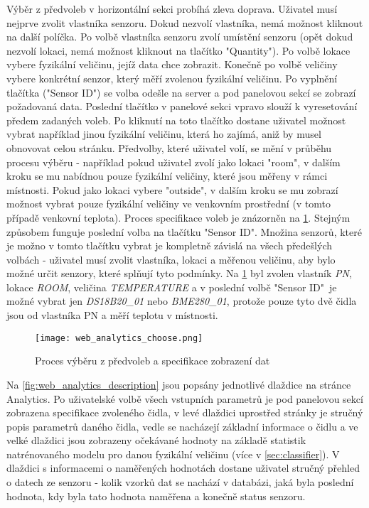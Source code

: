 Výběr z předvoleb v horizontální sekci probíhá zleva doprava. Uživatel musí nejprve zvolit vlastníka senzoru. Dokud nezvolí vlastníka, nemá možnost kliknout na další políčka. Po volbě vlastníka senzoru zvolí umístění senzoru (opět dokud nezvolí lokaci, nemá možnost kliknout na tlačítko "Quantity"). Po volbě lokace vybere fyzikální veličinu, jejíž data chce zobrazit. Konečně po volbě veličiny vybere konkrétní senzor, který měří zvolenou fyzikální veličinu. Po vyplnění tlačítka ("Sensor ID") se volba odešle na server a pod panelovou sekcí se zobrazí požadovaná data. Poslední tlačítko v panelové sekci vpravo slouží k vyresetování předem zadaných voleb. Po kliknutí na toto tlačítko dostane uživatel možnost vybrat například jinou fyzikální veličinu, která ho zajímá, aniž by musel obnovovat celou stránku. Předvolby, které uživatel volí, se mění v průběhu procesu výběru - například pokud uživatel zvolí jako lokaci "room", v dalším kroku se mu nabídnou pouze fyzikální veličiny, které jsou měřeny v rámci místnosti. Pokud jako lokaci vybere "outside", v dalším kroku se mu zobrazí možnost vybrat pouze fyzikální veličiny ve venkovním prostřední (v tomto případě venkovní teplota). Proces specifikace voleb je znázorněn na \cref{fig:web_analytics_choose}. Stejným způsobem funguje poslední volba na tlačítku "Sensor ID". Množina senzorů, které je možno v tomto tlačítku vybrat je kompletně závislá na všech předešlých volbách - uživatel musí zvolit vlastníka, lokaci a měřenou veličinu, aby bylo možné určit senzory, které splňují tyto podmínky. Na \cref{fig:web_analytics_choose} byl zvolen vlastník \textit{PN}, lokace \textit{ROOM}, veličina \textit{TEMPERATURE} a v poslední volbě "Sensor ID"\ je možné vybrat jen \textit{DS18B20\_01} nebo \textit{BME280\_01}, protože pouze tyto dvě čidla jsou od vlastníka PN a měří teplotu v místnosti.

\begin{figure}[H]
  \centering
  \texttt{[image: web\_analytics\_choose.png]}
  \caption{Proces výběru z předvoleb a specifikace zobrazení dat}
  \label{fig:web_analytics_choose}
\end{figure}

Na \cref{fig:web_analytics_description} jsou popsány jednotlivé dlaždice na stránce Analytics. Po uživatelské volbě všech vstupních parametrů je pod panelovou sekcí zobrazena specifikace zvoleného čidla, v levé dlaždici uprostřed stránky je stručný popis parametrů daného čidla, vedle se nacházejí základní informace o čidlu a ve velké dlaždici jsou zobrazeny očekávané hodnoty na základě statistik natrénovaného modelu pro danou fyzikální veličinu (více v \cref{sec:classifier}). V dlaždici s informacemi o naměřených hodnotách dostane uživatel stručný přehled o datech ze senzoru - kolik vzorků dat se nachází v databázi, jaká byla poslední hodnota, kdy byla tato hodnota naměřena a konečně status senzoru.

